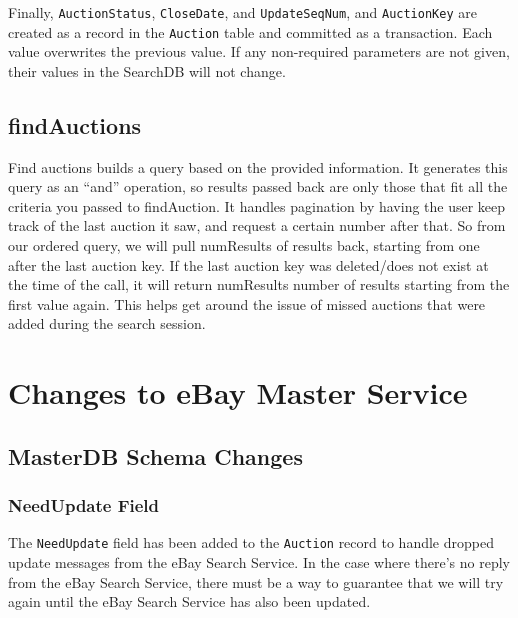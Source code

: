 \documentclass[12pt,a4paper]{article}
\begin{document}
\vspace{\baselineskip}
Finally, \texttt{AuctionStatus}, \texttt{CloseDate}, and \texttt{UpdateSeqNum}, and \texttt{AuctionKey} are created as a record in the \texttt{Auction} table 
and committed as a transaction.
Each value overwrites the previous value. If any non-required parameters are not given, their values in the SearchDB will not change.



\subsection{findAuctions}
Find auctions builds a query based on the provided information. It generates
this query as an ``and'' operation, so results passed back are only those that
fit all the criteria you passed to findAuction. It handles pagination by having
the user keep track of the last auction it saw, and request a certain number
after that. So from our ordered query, we will pull numResults of results back,
starting from one after the last auction key. If the last auction key was
deleted/does not exist at the time of the call, it will return numResults
number of results starting from the first value again. This helps get around
the issue of missed auctions that were added during the search session.

\pagebreak
\section{Changes to eBay Master Service}


\subsection{MasterDB Schema Changes}

\subsubsection{NeedUpdate Field} 
\label{sec:needupdate}


The \texttt{NeedUpdate} field has been added to the \texttt{Auction} record to handle 
dropped update messages from the eBay Search Service. In the case where there's no reply 
from the eBay Search Service, there must be a way to guarantee that we will try again 
until the eBay Search Service has also been updated.
\end{document}
